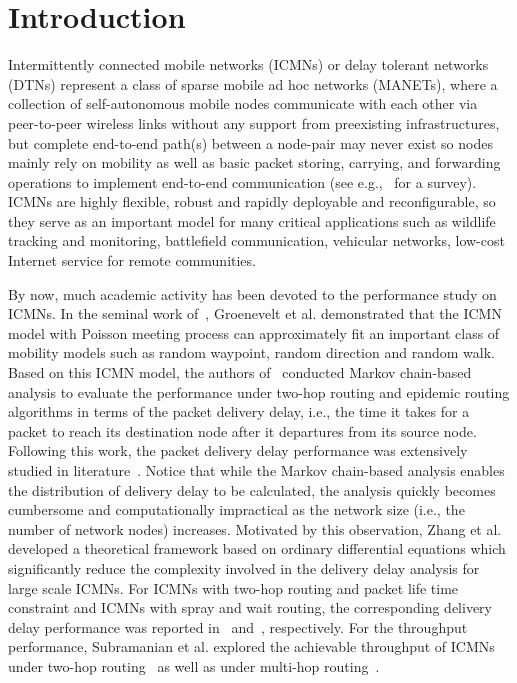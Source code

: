 \documentclass[twocolumn, 10pt]{svjour3}         \smartqed  \usepackage{graphicx}
\begin{document}
\section{Introduction}\label{sec:intro}

Intermittently connected mobile networks (ICMNs) or delay tolerant networks (DTNs) represent a class of sparse mobile ad hoc networks (MANETs), where a collection of self-autonomous mobile nodes communicate with each other via peer-to-peer wireless links without any support from preexisting infrastructures, but complete end-to-end path(s) between a node-pair may never exist so nodes mainly rely on mobility as well as basic packet storing, carrying, and forwarding operations to implement end-to-end communication (see e.g.,~\cite{Zhang2006} for a survey). ICMNs are highly flexible, robust and  rapidly deployable and reconfigurable, so they serve as an important model for many critical applications such as wildlife tracking and monitoring, battlefield communication, vehicular networks, low-cost Internet service for remote communities.



By now, much academic activity has been devoted to the performance study on ICMNs.
In the seminal work of~\cite{Groenevelt2005, Groenevelt2005a}, Groenevelt et al. demonstrated that the ICMN model with Poisson meeting process can approximately fit an important class of mobility models such as random waypoint, random direction and   random walk. 
Based on this ICMN model, the authors of~\cite{Groenevelt2005a} conducted  Markov chain-based analysis to evaluate the  performance under  two-hop routing and epidemic routing algorithms in terms of the packet delivery delay, i.e., the time it takes for a packet to reach its destination node after it departures from its source node.
Following this work, the packet delivery delay performance was extensively studied in literature~\cite{Zhang2007,AlHanbali2008,Spyropoulos2008,Spyropoulos2008a}.
Notice that while the Markov chain-based analysis enables the distribution of delivery delay to be calculated, the analysis quickly becomes cumbersome and computationally impractical as the network size (i.e., the number of network nodes) increases.
Motivated by this observation, Zhang et al.~\cite{Zhang2007} developed a theoretical framework based on ordinary differential equations which significantly reduce the complexity involved in the delivery delay analysis for large scale ICMNs.
For ICMNs with two-hop routing and packet life time constraint and ICMNs with spray and wait routing, the corresponding delivery delay performance was reported in~\cite{AlHanbali2008} and~\cite{Spyropoulos2008,Spyropoulos2008a}, respectively.
For the throughput performance, Subramanian  et al. explored the achievable throughput of ICMNs under two-hop routing~\cite{Subramanian2009Proc.IEEEISIT,Subramanian2009Proc.IEEEWiOPT} as well as under multi-hop routing~\cite{Subramanian2012Proc.IEEEICC}.
\end{document}
